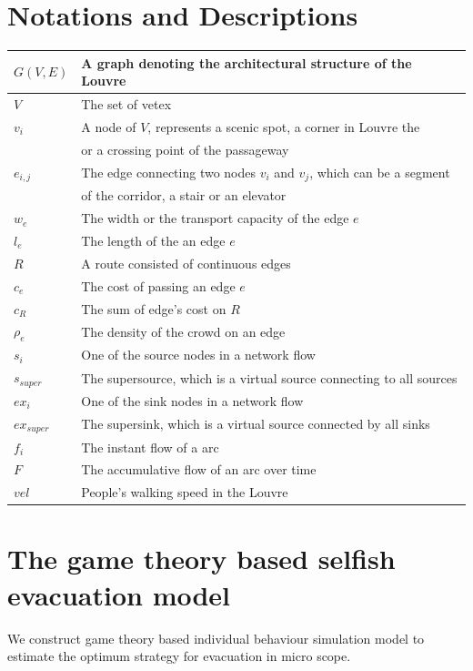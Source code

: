 \documentclass{mcmthesis}
\begin{document}
	\section{Notations and Descriptions}
	\begin{tabular}{l|l}
		\hline
		$G(V,E)$  & A graph denoting the architectural structure of the Louvre
		\bigstrut\\
		\hline
		$V$  &  The set of vetex \bigstrut\\
		\hline
		$v_i$  & A node of $V$, represents a scenic spot, a corner in Louvre the  \bigstrut\\
		& or a crossing point of the passageway \\
		\hline
		$e_{i,j}​$  & The edge connecting two nodes $v_i$ and $v_j$, which can be a segment \\ 
		& of the corridor, a stair or an elevator \bigstrut\\
		\hline
		$​w_e$  & The width or the transport capacity of the  edge $e$  \bigstrut\\
		\hline
		$l_e$  & The length of the an edge $e$ \bigstrut\\
		\hline
		$R$  &  A route consisted of continuous edges  \bigstrut\\
		\hline
		$c_e$     & The cost of passing  an edge $e$ \bigstrut\\
		\hline
		$c_R$   & The sum of edge's cost on $R$  \bigstrut\\
		\hline
		$\rho_e$  &The density of the crowd  on an edge \bigstrut\\
		\hline
		$s_i$  & One of the source nodes in a network flow \bigstrut\\
		\hline
		$s_{super}​$  & The supersource, which is a virtual source connecting to all sources
		\bigstrut\\
		\hline
		$ex_i$     & One of the sink nodes in a network flow  \bigstrut\\
		\hline
		$ex_{super}$ &The supersink, which is a virtual source connected by all sinks 
		\bigstrut\\
		\hline
		$f_i$ & The instant flow of a arc \bigstrut\\
		\hline
		$F$ &  The accumulative flow of an arc over time \bigstrut\\
		\hline
		$vel$     &   People's walking speed in the Louvre \bigstrut\\
		\hline
	\end{tabular}%
	\label{tab:addlabel}%
	\section{The game theory based selfish evacuation  model}
	We construct game theory based individual behaviour simulation model to estimate the optimum strategy for evacuation in micro scope.
	
\end{document}
